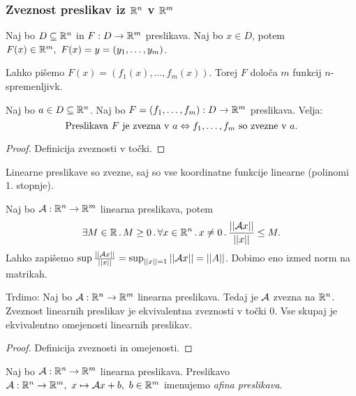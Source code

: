 \newpage
\subsubsection{Zveznost preslikav iz $\mathbb{R}^n$ v $\mathbb{R}^m$}
Naj bo $D \subseteq \mathbb{R}^n$ in $F: D \to \mathbb{R}^m$ preslikava. Naj bo $x \in D$, potem $F(x) \in \mathbb{R}^m, \ F(x) = y = (y_1, \ldots, y_m)$.

Lahko pišemo $F(x) = (f_1(x), \ldots, f_m(x))$. Torej $F$ določa $m$ funkcij $n$-spremenljivk.

\begin{trditev}
    Naj bo $a \in D \subseteq \mathbb{R}^n$. Naj bo $F=(f_1, \ldots, f_m): D \to \mathbb{R}^m$ preslikava. Velja:
    $$\text{Preslikava } F \text{ je zvezna v } a \Leftrightarrow f_1,\ldots, f_m \text{ so zvezne v } a.$$
\end{trditev}

\begin{proof}
    Definicija zveznosti v točki.
\end{proof}

\begin{opomba}
    Linearne preslikave so zvezne, saj so vse koordinatne funkcije linearne (polinomi 1. stopnje).
\end{opomba}

\begin{zgled}
    Naj bo $\mathcal{A}: \mathbb{R}^n \to \mathbb{R}^m$ linearna preslikava, potem $$\exists  M \in \mathbb{R} \, . \, M \geq 0 \,.\, \forall x \in \mathbb{R}^n \, . \, x \neq 0  \,.\,  \frac{||\mathcal{A}x||}{||x||} \leq M.$$
    Lahko zapišemo $\sup \frac{||\mathcal{A}x||}{||x||} = \sup_{||x||=1}||\mathcal{A}x|| = ||A||$. Dobimo eno izmed norm na matrikah.

    Trdimo: Naj bo $\mathcal{A}: \mathbb{R}^n \to \mathbb{R}^m$ linearna preslikava. Tedaj je $\mathcal{A}$ zvezna na $\mathbb{R}^n$. Zveznost linearnih preslikav je ekvivalentna zveznosti v točki $0$. Vse skupaj je ekvivalentno omejenosti linearnih preslikav.
\end{zgled}

\begin{proof}
    Definicija zveznosti in omejenosti.
\end{proof}

\begin{definicija}
    Naj bo $\mathcal{A}: \mathbb{R}^n \to \mathbb{R}^m$ linearna preslikava. Preslikavo $\mathcal{A}: \mathbb{R}^n \to \mathbb{R}^m, \ x \mapsto \mathcal{A}x + b, \ b \in \mathbb{R}^m$ imenujemo \emph{afina preslikava}.
\end{definicija}

